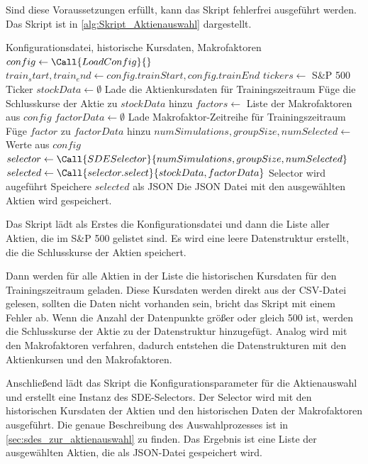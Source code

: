 Sind diese Voraussetzungen erfüllt, kann das Skript fehlerfrei ausgeführt werden. Das Skript ist in \cref{alg:Skript_Aktienauswahl} dargestellt.
\begin{algorithm}
    \caption{Skript Aktienauswahl}\label{alg:Skript_Aktienauswahl}
    \small
    \begin{algorithmic}[1]
        \Require Konfigurationsdatei, historische Kursdaten, Makrofaktoren
        \State $config \gets \Call{LoadConfig}{}$
        \State $train_start, train_end \gets config.trainStart, config.trainEnd$
        \State $tickers \gets$ S\&P 500 Ticker
        \State $stockData \gets \emptyset$
        \State Lade die Aktienkursdaten für Trainingszeitraum
        \State Füge die Schlusskurse der Aktie zu $stockData$ hinzu
        \EndIf
        \EndFor
        \State $factors \gets$ Liste der Makrofaktoren aus $config$
        \State $factorData \gets \emptyset$
        \State Lade Makrofaktor-Zeitreihe für Trainingszeitraum
        \State Füge $factor$ zu $factorData$ hinzu
        \EndIf
        \EndFor
        \State $numSimulations, groupSize, numSelected \gets$ Werte aus $config$
        \State $selector \gets \Call{SDESelector}{numSimulations, groupSize, numSelected}$
        \State $selected \gets \Call{selector.select}{stockData, factorData}$ Selector wird augeführt
        \State Speichere $selected$ als JSON
        \State Die JSON Datei mit den ausgewählten Aktien wird gespeichert.
    \end{algorithmic}
\end{algorithm}
Das Skript lädt als Erstes die Konfigurationsdatei und dann die Liste aller Aktien, die im S\&P 500 gelistet sind. Es wird eine leere Datenstruktur erstellt, die die Schlusskurse der Aktien speichert.

Dann werden für alle Aktien in der Liste die historischen Kursdaten für den Trainingszeitraum geladen. Diese Kursdaten werden direkt aus der CSV-Datei gelesen, sollten die Daten nicht vorhanden sein, bricht das Skript mit einem Fehler ab. Wenn die Anzahl der Datenpunkte größer oder gleich 500 ist, werden die Schlusskurse der Aktie zu der Datenstruktur hinzugefügt. Analog wird mit den Makrofaktoren verfahren, dadurch entstehen die Datenstrukturen mit den Aktienkursen und den Makrofaktoren.

Anschließend lädt das Skript die Konfigurationsparameter für die Aktienauswahl und erstellt eine Instanz des SDE-Selectors. Der Selector wird mit den historischen Kursdaten der Aktien und den historischen Daten der Makrofaktoren ausgeführt. Die genaue Beschreibung des Auswahlprozesses ist in \cref{sec:sdes_zur_aktienauswahl} zu finden. Das Ergebnis ist eine Liste der ausgewählten Aktien, die als JSON-Datei gespeichert wird.


